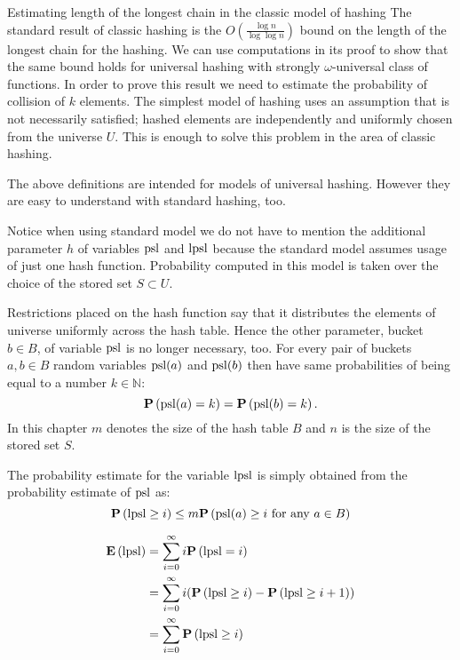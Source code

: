 \begin{section}{Estimating length of the longest chain in the classic model of hashing}
The standard result of classic hashing is the $O\left(\frac{\log n}{\log \log n}\right)$ bound on the length of the longest chain for the hashing. We can use computations in its proof to show that the same bound holds for universal hashing with strongly $\omega$-universal class of functions. In order to prove this result we need to estimate the probability of collision of $k$ elements. The simplest model of hashing uses an assumption that is not necessarily satisfied; hashed elements are independently and uniformly chosen from the universe $U$. This is enough to solve this problem in the area of classic hashing. 

The above definitions are intended for models of universal hashing. However they are easy to understand with standard hashing, too. 

Notice when using standard model we do not have to mention the additional parameter $h$ of variables $\mathrm{psl}$ and $\mathrm{lpsl}$ because the standard model assumes usage of just one hash function. Probability computed in this model is taken over the choice of the stored set $S \subset U$. 

Restrictions placed on the hash function say that it distributes the elements of universe uniformly across the hash table. Hence the other parameter, bucket $b \in B$, of variable $\mathrm{psl}$ is no longer necessary, too. For every pair of buckets $a, b \in B$ random variables $\mathrm{psl}(a)$ and $\mathrm{psl}(b)$ then have same probabilities of being equal to a number $k \in \mathbb{N}$: \[\mathbf{P}\left(\mathrm{psl}(a) = k\right) = \mathbf{P}\left(\mathrm{psl}(b) = k\right) \text{.}\] In this chapter $m$ denotes the size of the hash table $B$ and $n$ is the size of the stored set $S$.

The probability estimate for the variable $\mathrm{lpsl}$ is simply obtained from the probability estimate of $\mathrm{psl}$ as:
\begin{displaymath}
\mathbf{P}\left(\mathrm{lpsl} \geq i\right) \leq m \mathbf{P}\left(\mathrm{psl}(a) \geq i \text{ for any } a \in B\right)
\end{displaymath}

\begin{displaymath}
\begin{split}
\mathbf{E}\left(\mathrm{lpsl}\right)
	& = \displaystyle \sum_{i=0}^{\infty} i \mathbf{P}\left(\mathrm{lpsl} = i\right) \\
	& = \displaystyle \sum_{i = 0}^{\infty} i (\mathbf{P}\left(\mathrm{lpsl} \geq i\right) - \mathbf{P}\left(\mathrm{lpsl} \geq i + 1\right)) \\ 
	& = \displaystyle \sum_{i = 0}^{\infty} \mathbf{P}\left(\mathrm{lpsl} \geq i\right)
\end{split}
\end{displaymath}


\end{section}
